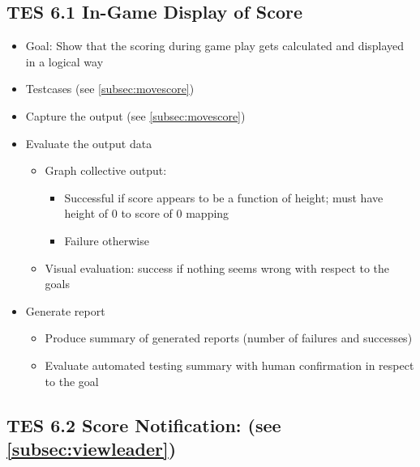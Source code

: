 \subsection{TES 6.1 In-Game Display of Score}
\begin{itemize}
\item Goal: Show that the scoring during game play gets calculated and displayed in a logical way

\item Testcases (see \ref{subsec:movescore})

\item Capture the output (see \ref{subsec:movescore})

\item Evaluate the output data
\begin{itemize}
\item Graph collective output:
\begin{itemize}
\item Successful if score appears to be a function of height; must have height of 0 to score of 0 mapping
\item Failure otherwise
\end{itemize}
\item Visual evaluation: success if nothing seems wrong with respect to the goals
\end{itemize}

\item Generate report
\begin{itemize}
\item Produce summary of generated reports (number of failures and successes)
\item Evaluate automated testing summary with human confirmation in respect to the goal
\end{itemize}
\end{itemize}

\subsection{TES 6.2 Score Notification: (see \ref{subsec:viewleader})}

